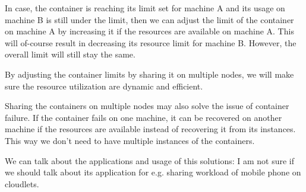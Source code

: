 In case, the container is reaching its limit set for machine A and its usage on machine B is still under the limit, then we can adjust the limit of the container on machine A by increasing it if the resources are available on machine A. This will of-course result in decreasing its resource limit for machine B.  However, the overall limit will still stay the same.

By adjusting the container limits by sharing it on multiple nodes, we will make sure the resource utilization are dynamic and efficient. 

Sharing the containers on multiple nodes may also solve the issue of container failure. If the container fails on one machine, it can be recovered on another machine if the resources are available instead of recovering it from its instances. This way we don't need to have multiple instances of the containers.


We can talk about the applications and usage of this solutions: I am not sure if we should talk about its application for e.g. sharing workload of mobile phone on cloudlets.